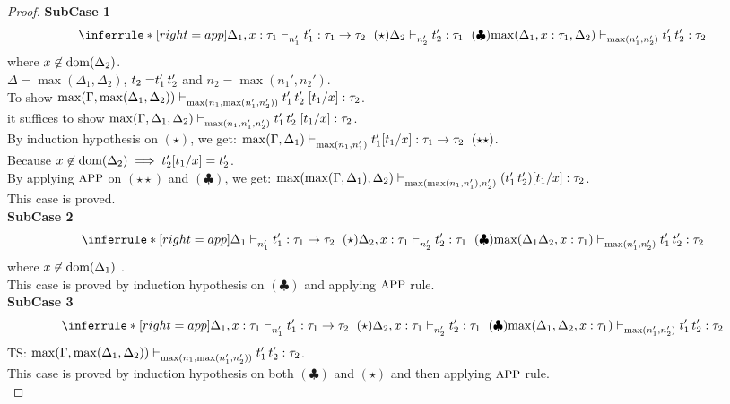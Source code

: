 \documentclass{article}
\begin{document}
\begin{proof}
 \textbf{SubCase 1} 
$$
  \inferrule*[ right = app ]
   {\Delta_1, x: \tau_1 \jtype{n_1'}{}{t_1'}{\tau_1 \rightarrow \tau_2} ~(\star) \\ \Delta_2 \jtype{n_2'}{}{t_2'}{\tau_1} ~ (\clubsuit)}
   { \max(\Delta_1, x: \tau_1, \Delta_2) \jtype{\max(n_1',n_2')}{}{\app{t_1'}{t_2'}}{\tau_2} }
$$
where $x \not \in \text{dom}(\Delta_2)$. \\
$\Delta = \max(\Delta_1, \Delta_2)$, $t_2 = \mathrel{ {t_1'} \, {t_2'} }$ and $n_2 = \max(n_1',n_2')$.\\
To show $\max(\Gamma,\max(\Delta_1, \Delta_2))\mathrel{\vdash_{\max(n_1, \max(n_1',n_2'))}^{} {\mathrel{ {t_1'} \, {t_2'} }[t_1/x]} : {\tau_2}} $.\\
it suffices to show $\max(\Gamma,\Delta_1, \Delta_2)\mathrel{\vdash_{\max(n_1, n_1',n_2')}^{} {\mathrel{ {t_1'} \, {t_2'} }[t_1/x]} : {\tau_2}} $.\\
By induction hypothesis on $(\star)$, we get: 
$\max(\Gamma,\Delta_1)\jtype{\max(n_1, n_1')}{}{t_1'[t_1/x]}{\tau_1 \rightarrow \tau_2}~(\star \star) $.\\
Because $x \not \in \text{dom}(\Delta_2) \implies t_2'[t_1/x] = t_2'$.\\
By applying $\mbox{\small{APP}}$ on $(\star \star)$ and $(\clubsuit)$, we get:
$\max(\max(\Gamma,\Delta_1), \Delta_2)\mathrel{\vdash_{\max(\max(n_1, n_1'),n_2')}^{} {(\mathrel{ {t_1'} \, {t_2'} })[t_1/x]} : {\tau_2}} $.\\
This case is proved.\\

 \textbf{SubCase 2} 
$$
  \inferrule*[ right = app ]
   {\Delta_1 \jtype{n_1'}{}{t_1'}{\tau_1 \rightarrow \tau_2} ~(\star) \\ \Delta_2, x: \tau_1 \jtype{n_2'}{}{t_2'}{\tau_1} ~ (\clubsuit)}
   { \max(\Delta_1 \Delta_2, x: \tau_1) \jtype{\max(n_1',n_2')}{}{\app{t_1'}{t_2'}}{\tau_2} }
$$
where $x \not \in \text{dom}(\Delta_1)$ .\\
This case is proved by induction hypothesis on $(\clubsuit)$ and applying $\mbox{\small{APP}}$ rule.\\

 \textbf{SubCase 3} 
$$
  \inferrule*[ right = app ]
   {\Delta_1, x: \tau_1 \jtype{n_1'}{}{t_1'}{\tau_1 \rightarrow \tau_2}~(\star) \\ \Delta_2, x: \tau_1 \jtype{n_2'}{}{t_2'}{\tau_1}~(\clubsuit)}
   { \max(\Delta_1, \Delta_2, x: \tau_1) \jtype{\max(n_1',n_2')}{}{\app{t_1'}{t_2'}}{\tau_2}  }
$$
TS: $\max(\Gamma, \max( \Delta_1, \Delta_2) ) \mathrel{\vdash_{\max(n_1, \max(n_1',n_2'))}^{} {\mathrel{ {t_1'} \, {t_2'} }} : {\tau_2}} $. \\
This case is proved by induction hypothesis on both $(\clubsuit)$ and $(\star)$ and then applying $\mbox{\small{APP}}$ rule.\\


\end{proof}
\end{document}
